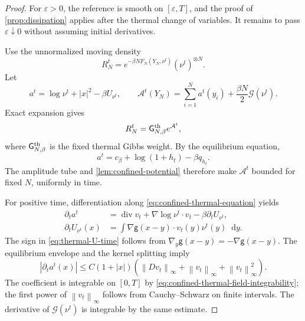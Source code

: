 \documentclass[11pt,reqno]{amsart}
\numberwithin{equation}{section}
\theoremstyle{definition}
\theoremstyle{remark}
\newcommand{\g}{\mathsf g}
\newcommand{\G}{\mathsf G}
\newcommand{\diver}{\operatorname{div}}
\newcommand{\dd}{\mathop{}\!\mathrm d}
\newcommand{\norm}[1]{\left\lVert#1\right\rVert}
\begin{document}
\begin{proof}
For $\varepsilon>0$, the reference is smooth on $[\varepsilon,T]$, and the proof of \cref{prop:dissipation} applies after the thermal change of variables. It remains to pass $\varepsilon\downarrow0$ without assuming initial derivatives.

Use the unnormalized moving density
\begin{equation}\label{eq:thermal-moving-density}
 R_N^t=e^{-\beta NF_N(Y_N,\nu^t)}(\nu^t)^{\otimes N}.
\end{equation}
Let
\begin{equation}\label{eq:thermal-moving-potential}
 a^t=\log\nu^t+|x|^2-\beta U_{\nu^t},
 \qquad
 \mathcal A^t(Y_N)=\sum_{i=1}^Na^t(y_i)+\frac{\beta N}{2}\mathcal G(\nu^t).
\end{equation}
Exact expansion gives
\begin{equation}\label{eq:thermal-moving-factorization}
 R_N^t=\G_{N,\beta}^{\rm th}e^{\mathcal A^t},
\end{equation}
where $\G_{N,\beta}^{\rm th}$ is the fixed thermal Gibbs weight. By the equilibrium equation,
\begin{equation}\label{eq:thermal-a-ratio}
 a^t=c_\beta+\log(1+h_t)-\beta q_{h_t}.
\end{equation}
The amplitude tube and \cref{lem:confined-potential} therefore make $\mathcal A^t$ bounded for fixed $N$, uniformly in time.

For positive time, differentiation along \eqref{eq:confined-thermal-equation} yields
\begin{align}
 \partial_ta^t&=\diver v_t+\nabla\log\nu^t\cdot v_t-
          \beta\partial_tU_{\nu^t},
 \label{eq:thermal-a-time}\\
 \partial_tU_{\nu^t}(x)&=\int\nabla\g(x-y)\cdot v_t(y)\nu^t(y)\dd y.
 \label{eq:thermal-U-time}
\end{align}
The sign in \eqref{eq:thermal-U-time} follows from
$\nabla_y\g(x-y)=-\nabla\g(x-y)$. The equilibrium envelope and the kernel splitting imply
\begin{equation}\label{eq:thermal-moving-growth}
 |\partial_ta^t(x)|\leq C(1+|x|)
 \left(\norm{Dv_t}_\infty+\norm{v_t}_\infty+\norm{v_t}_\infty^2\right).
\end{equation}
The coefficient is integrable on $[0,T]$ by \eqref{eq:confined-thermal-field-integrability}; the first power of $\norm{v_t}_\infty$ follows from Cauchy--Schwarz on finite intervals. The derivative of $\mathcal G(\nu^t)$ is integrable by the same estimate.


\end{proof}
\end{document}
